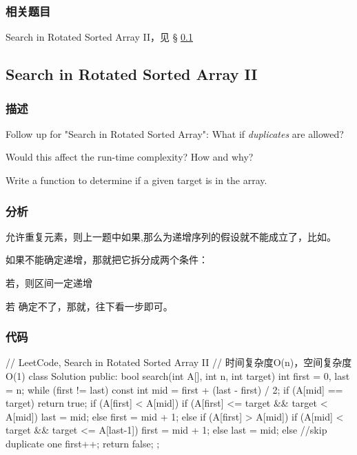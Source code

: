 \subsubsection{相关题目}

\begindot
\item Search in Rotated Sorted Array II，见 \S 
\ref{sec:search-in-rotated-sorted-array-ii}
\myenddot


\subsection{Search in Rotated Sorted Array II}
\label{sec:search-in-rotated-sorted-array-ii}


\subsubsection{描述}
Follow up for "Search in Rotated Sorted Array": What if \emph{duplicates} are 
allowed?

Would this affect the run-time complexity? How and why?

Write a function to determine if a given target is in the array.


\subsubsection{分析}
允许重复元素，则上一题中如果,那么\fn{[l,m]}为递增序列的假设就不能成立了，比如\code{[1,3,1,1,1]}。

如果不能确定递增，那就把它拆分成两个条件：
\begindot
\item 若，则区间\fn{[l,m]}一定递增
\item 若 确定不了，那就，往下看一步即可。
\myenddot

\subsubsection{代码}
\begin{Code}
	// LeetCode, Search in Rotated Sorted Array II
	// 时间复杂度O(n)，空间复杂度O(1)
	class Solution {
		public:
		bool search(int A[], int n, int target) {
			int first = 0, last = n;
			while (first != last) {
				const int mid = first  + (last - first) / 2;
				if (A[mid] == target)
				return true;
				if (A[first] < A[mid]) {
					if (A[first] <= target && target < A[mid])
					last = mid;
					else
					first = mid + 1;
				} else if (A[first] > A[mid]) {
				if (A[mid] < target && target <= A[last-1])
				first = mid + 1;
				else
				last = mid;
			} else
			//skip duplicate one
			first++;
		}
		return false;
	}
};
\end{Code}


